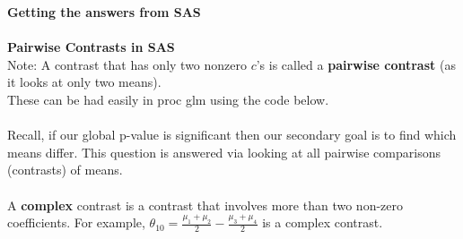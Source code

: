 \Large \textbf{Getting the answers from SAS}\large\\~\\
\textbf{Pairwise Contrasts in SAS}\\
Note:  A contrast that has only two nonzero $c$'s is called a \textbf{pairwise contrast} (as it looks at only two means). \\ These can be had easily in proc glm using the code below.\\~\\
Recall, if our global p-value is significant then our secondary goal is to find which means differ.  This question is answered via looking at all pairwise comparisons (contrasts) of means.
\\~\\
A \textbf{complex} contrast is a contrast that involves more than two non-zero coefficients.  For example, $\theta_{10}=\frac{\mu_{1}+\mu_{2}}{2}-\frac{\mu_{3}+\mu_{4}}{2}$ is a complex contrast.  \\~\\

